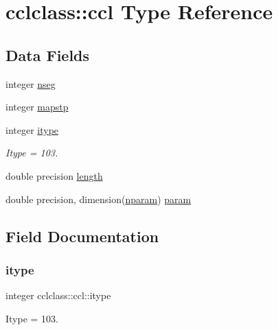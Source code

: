 \hypertarget{structcclclass_1_1ccl}{}\section{cclclass\+::ccl Type Reference}
\label{structcclclass_1_1ccl}
\subsection*{Data Fields}
\begin{DoxyCompactItemize}
\item 
integer \mbox{\hyperlink{structcclclass_1_1ccl_a37e0a279ff69258948ddecf0a4c78045}{nseg}}
\item 
integer \mbox{\hyperlink{structcclclass_1_1ccl_a5d663b5eeafc5a924cfe6383143f9b0a}{mapstp}}
\item 
integer \mbox{\hyperlink{structcclclass_1_1ccl_ac0907eebcd93b9aa41c33858f394496d}{itype}}
\begin{DoxyCompactList}\small\item\em Itype = 103. \end{DoxyCompactList}\item 
double precision \mbox{\hyperlink{structcclclass_1_1ccl_a128d51138685ec33b8c0c7f6bd89dc81}{length}}
\item 
double precision, dimension(\mbox{\hyperlink{namespacecclclass_adeb399ff41e54cda7bdefa51063c0de6}{nparam}}) \mbox{\hyperlink{structcclclass_1_1ccl_a4b800d069f005c436b2295924f8f7bb9}{param}}
\end{DoxyCompactItemize}


\subsection{Field Documentation}
\mbox{\label{structcclclass_1_1ccl_ac0907eebcd93b9aa41c33858f394496d}} 
\subsubsection{\texorpdfstring{itype}{itype}}
{\footnotesize\ttfamily integer cclclass\+::ccl\+::itype}



Itype = 103. 

\mbox{\label{structcclclass_1_1ccl_a128d51138685ec33b8c0c7f6bd89dc81}} 
